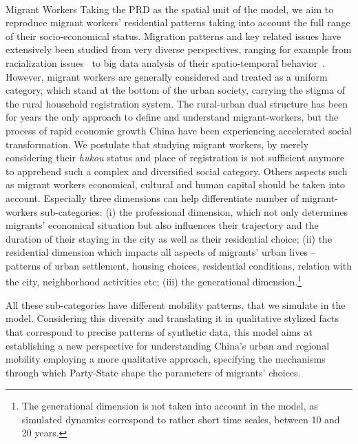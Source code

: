 \paragraph{}{Migrant Workers}
Taking the PRD as the spatial unit of the model, we aim to reproduce migrant workers’ residential patterns taking into account the full range of their socio-economical status. Migration patterns and key related issues have extensively been studied from very diverse perspectives, ranging for example from racialization issues~\cite{dong2010policing} to big data analysis of their spatio-temporal behavior~\cite{2017arXiv170600682Y}. However, migrant workers are generally considered and treated as a uniform category, which stand at the bottom of the urban society, carrying the stigma of the rural household registration system. The rural-urban dual structure has been for years the only approach to define and understand migrant-workers, but the process of rapid economic growth China have been experiencing accelerated social transformation. We postulate that studying migrant workers, by merely considering their \emph{hukou} status and place of registration is not sufficient anymore to apprehend such a complex and diversified social category. Others aspects such as migrant workers economical, cultural and human capital should be taken into account.
Especially three dimensions can help differentiate number of migrant-workers sub-categories: (i) the professional dimension, which not only determines migrants’ economical situation but also influences their trajectory and the duration of their staying in the city as well as their residential choice; (ii) the residential dimension which impacts all aspects of migrants’ urban lives – patterns of urban settlement, housing choices, residential conditions, relation with the city, neighborhood activities etc; (iii) the generational dimension.\footnote{The generational dimension is not taken into account in the model, as simulated dynamics correspond to rather short time scales, between 10 and 20 years.}




All these sub-categories have different mobility patterns, that we simulate in the model.
Considering this diversity and translating it in qualitative stylized facts that correspond to precise patterns of synthetic data, this model aims at establishing a new perspective for understanding China’s urban and regional mobility employing a more qualitative approach, specifying the mechanisms through which Party-State shape the parameters of migrants’ choices. 






